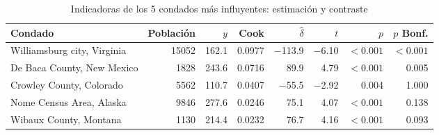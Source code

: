 \begin{table}[htbp]
\centering
\footnotesize
\caption{Indicadoras de los 5 condados más influyentes: estimación y contraste}\label{tab:indicadoras-condados}
\begin{tabularx}{\linewidth}{>{\raggedright\arraybackslash}X r r r r r r r}
\toprule
Condado & Población & $y$ & Cook & $\hat\delta$ & $t$ & $p$ & $p$ Bonf. \\
\midrule
Williamsburg city, Virginia & \num{15052} & \num{162.1} & \num{0.0977} & \num{-113.9} & \num{-6.10} & $<\num{0.001}$ & $<\num{0.001}$ \\
De Baca County, New Mexico & \num{1828} & \num{243.6} & \num{0.0716} & \num{89.9} & \num{4.79} & $<\num{0.001}$ & \num{0.005} \\
Crowley County, Colorado & \num{5562} & \num{110.7} & \num{0.0407} & \num{-55.5} & \num{-2.92} & \num{0.004} & \num{1.000} \\
Nome Census Area, Alaska & \num{9846} & \num{277.6} & \num{0.0246} & \num{75.1} & \num{4.07} & $<\num{0.001}$ & \num{0.138} \\
Wibaux County, Montana & \num{1130} & \num{214.4} & \num{0.0232} & \num{76.7} & \num{4.16} & $<\num{0.001}$ & \num{0.093} \\
\bottomrule
\end{tabularx}
\par{}
\end{table}
